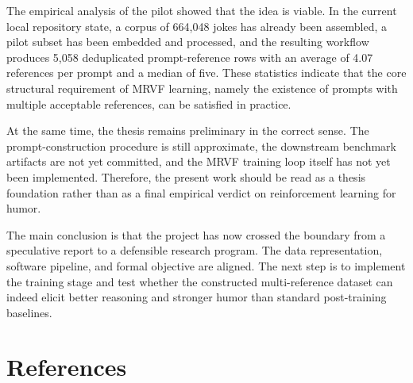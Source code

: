 \documentclass[14pt,a4paper]{extreport}
\begin{document}
The empirical analysis of the pilot showed that the idea is viable. In the current local repository state, a corpus of 664{,}048 jokes has already been assembled, a pilot subset has been embedded and processed, and the resulting workflow produces 5{,}058 deduplicated prompt-reference rows with an average of 4.07 references per prompt and a median of five. These statistics indicate that the core structural requirement of MRVF learning, namely the existence of prompts with multiple acceptable references, can be satisfied in practice.

At the same time, the thesis remains preliminary in the correct sense. The prompt-construction procedure is still approximate, the downstream benchmark artifacts are not yet committed, and the MRVF training loop itself has not yet been implemented. Therefore, the present work should be read as a thesis foundation rather than as a final empirical verdict on reinforcement learning for humor.

The main conclusion is that the project has now crossed the boundary from a speculative report to a defensible research program. The data representation, software pipeline, and formal objective are aligned. The next step is to implement the training stage and test whether the constructed multi-reference dataset can indeed elicit better reasoning and stronger humor than standard post-training baselines.

\chapter*{References}
\end{document}
